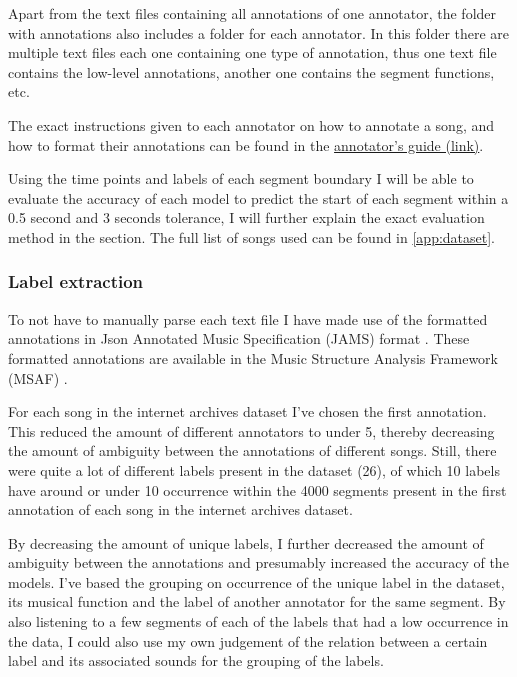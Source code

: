 Apart from the text files containing all annotations of one annotator, the folder with annotations also includes a folder for each annotator. In this folder there are multiple text files each one containing one type of annotation, thus one text file contains the low-level annotations, another one contains the segment functions, etc.

The exact instructions given to each annotator on how to annotate a song, and how to format their annotations can be found in the \href{https://github.com/DDMAL/salami-data-public/blob/master/SALAMI%20Annotator%20Guide.pdf}{annotator's guide (link)}.

Using the time points and labels of each segment boundary I will be able to evaluate the accuracy of each model to predict the start of each segment within a 0.5 second and 3 seconds tolerance, I will further explain the exact evaluation method in the  section. The full list of songs used can be found in \autoref{app:dataset}.

\subsubsection{Label extraction}

To not have to manually parse each text file I have made use of the formatted annotations in Json Annotated Music Specification (JAMS) format \cite{Humphrey2014jams}. These formatted annotations are available in the Music Structure Analysis Framework (MSAF) \cite{Nieto2016systematic}.

For each song in the internet archives dataset I've chosen the first annotation. This reduced the amount of different annotators to under 5, thereby decreasing the amount of ambiguity between the annotations of different songs. Still, there were quite a lot of different labels present in the dataset (26), of which 10 labels have around or under 10 occurrence within the 4000 segments present in the first annotation of each song in the internet archives dataset.

By decreasing the amount of unique labels, I further decreased the amount of ambiguity between the annotations and presumably increased the accuracy of the models. I've based the grouping on occurrence of the unique label in the dataset, its musical function and the label of another annotator for the same segment. By also listening to a few segments of each of the labels that had a low occurrence in the data, I could also use my own judgement of the relation between a certain label and its associated sounds for the grouping of the labels. 

